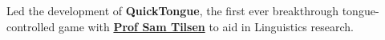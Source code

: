 \documentclass[]{deedy-resume-openfont}
\begin{document}
\begin{minipage}[t]{1.0\textwidth}
Led the development of \textbf{QuickTongue}, the first ever breakthrough tongue-controlled game with \textbf{\href{http://conf.ling.cornell.edu/~tilsen/}{Prof Sam Tilsen}} to aid in Linguistics research. 
\sectionsep



\end{minipage} 
\end{document}

